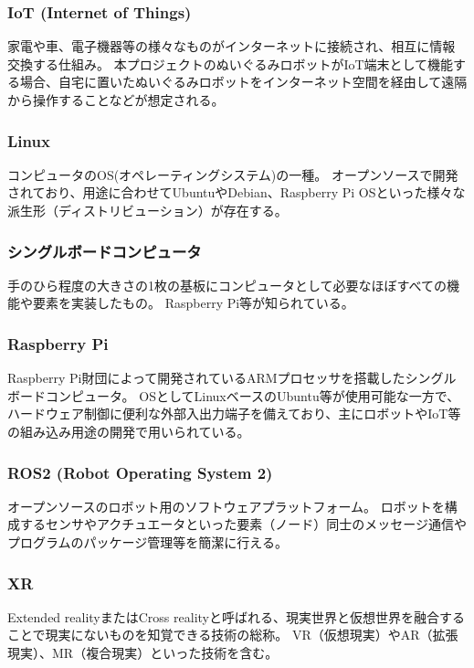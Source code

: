 \documentclass[uplatex,a4paper,12pt]{jsarticle}
\begin{document}
\subsubsection*{IoT (Internet of Things) \label{term:iot}}
家電や車、電子機器等の様々なものがインターネットに接続され、相互に情報交換する仕組み。
本プロジェクトのぬいぐるみロボットがIoT端末として機能する場合、自宅に置いたぬいぐるみロボットをインターネット空間を経由して遠隔から操作することなどが想定される。

\subsubsection*{Linux \label{term:linux}}
コンピュータのOS(オペレーティングシステム)の一種。
オープンソースで開発されており、用途に合わせてUbuntuやDebian、Raspberry Pi OSといった様々な派生形（ディストリビューション）が存在する。


\subsubsection*{シングルボードコンピュータ \label{term:sbc}}
手のひら程度の大きさの1枚の基板にコンピュータとして必要なほぼすべての機能や要素を実装したもの。
Raspberry Pi等が知られている。

\subsubsection*{Raspberry Pi \label{term:raspi}}
Raspberry Pi財団によって開発されているARMプロセッサを搭載したシングルボードコンピュータ。
OSとしてLinuxベースのUbuntu等が使用可能な一方で、ハードウェア制御に便利な外部入出力端子を備えており、主にロボットやIoT等の組み込み用途の開発で用いられている。

\subsubsection*{ROS2 (Robot Operating System 2) \label{term:ros2}}
オープンソースのロボット用のソフトウェアプラットフォーム。
ロボットを構成するセンサやアクチュエータといった要素（ノード）同士のメッセージ通信やプログラムのパッケージ管理等を簡潔に行える。

\subsubsection*{XR}
Extended realityまたはCross realityと呼ばれる、現実世界と仮想世界を融合することで現実にないものを知覚できる技術の総称。
VR（仮想現実）やAR（拡張現実）、MR（複合現実）といった技術を含む。
\end{document}
